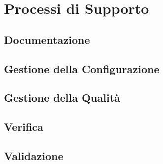 \chapter{Processi di Supporto}

\section{Documentazione}
\section{Gestione della Configurazione}
\section{Gestione della Qualità}
\section{Verifica}
\section{Validazione}